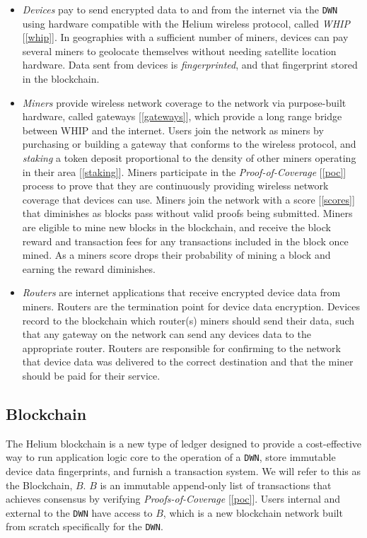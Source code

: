 \documentclass[letterpaper,11pt]{article}
\begin{document}
\begin{itemize}
	\item \textit{Devices} pay to send encrypted data to and from the internet via the \verb|DWN| using hardware compatible with the Helium wireless protocol, called \textit{WHIP} [\ref{whip}]. In geographies with a sufficient number of miners, devices can pay several miners to geolocate themselves without needing satellite location hardware. Data sent from devices is \textit{fingerprinted}, and that fingerprint stored in the blockchain.
	\item \textit{Miners} provide wireless network coverage to the network via purpose-built hardware, called gateways [\ref{gateways}], which provide a long range bridge between WHIP and the internet. Users join the network as miners by purchasing or building a gateway that conforms to the wireless protocol, and \textit{staking} a token deposit proportional to the density of other miners operating in their area [\ref{staking}]. Miners participate in the \textit{Proof-of-Coverage} [\ref{poc}] process to prove that they are continuously providing wireless network coverage that devices can use. Miners join the network with a score [\ref{scores}] that diminishes as blocks pass without valid proofs being submitted. Miners are eligible to mine new blocks in the blockchain, and receive the block reward and transaction fees for any transactions included in the block once mined. As a miners score drops their probability of mining a block and earning the reward diminishes.
	\item \textit{Routers} are internet applications that receive encrypted device data from miners. Routers are the termination point for device data encryption. Devices record to the blockchain which router(s) miners should send their data, such that any gateway on the network can send any devices data to the appropriate router. Routers are responsible for confirming to the network that device data was delivered to the correct destination and that the miner should be paid for their service.
\end{itemize}

\subsection{Blockchain}

The Helium blockchain is a new type of ledger designed to provide a cost-effective way to run application logic core to the operation of a \verb|DWN|, store immutable device data fingerprints, and furnish a transaction system. We will refer to this as the Blockchain, $\mathit{B}$. $\mathit{B}$ is an immutable append-only list of transactions that achieves consensus by verifying \textit{Proofs-of-Coverage} [\ref{poc}]. Users internal and external to the \verb|DWN| have access to $\mathit{B}$, which is a new blockchain network built from scratch specifically for the \verb|DWN|.\newline
\end{document}
